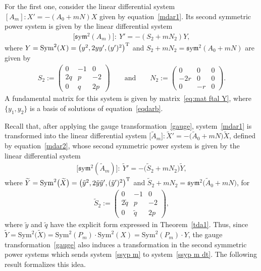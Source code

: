 \documentclass[pdftex]{sigma}%
\numberwithin{equation}{section}
\def\Sym{\mathrm{Sym}}
\def\sym{\mathfrak{s}\mathrm{y}\mathfrak{m}}
\begin{document}
For the first one, consider the linear differential system $[A_m]\colon X'=-(A_0+mN) X$ given by equation~\eqref{mdar1}. Its second symmetric power system is given by the linear differential system
\begin{gather}\label{ssyp m}
\big[\sym^2 (A_m)\big]\colon\ Y'=-(S_2 +m N_2) Y ,
\end{gather}
where $Y=\Sym^2 (X) = \big(y^2 ,2yy', (y')^2\big)^{\rm T}$ and $S_2 +m N_2 = \sym^2 (A_0 +mN)$ are given by
\begin{gather*}
S_2:=\begin{pmatrix} 0&-1&0\\2q &p &-2\\0&q&2p\end{pmatrix} \qquad \text{and} \qquad N_2:=\begin{pmatrix}0&0&0\\ -2r& 0& 0\\0&- r&0\end{pmatrix}\!.
\end{gather*}
A fundamental matrix for this system is given by matrix~\eqref{eq:mat ftal Y}, where $\{ y_1, y_2 \}$ is a basis of solutions of equation~\eqref{eqdarb}.

Recall that, after applying the gauge transformation~\eqref{gauge}, system~\eqref{mdar1} is transformed into the linear differential system $\big[\widetilde{A}_m\big]\colon \widetilde{X}'=-\big(\widetilde A_0+mN\big) \widetilde{X}$, defined by equation~\eqref{mdar2}, whose second symmetric power system is given by the linear differential system
\begin{gather}\label{ssyp m dt}
\big[\sym^2 (\widetilde{A}_m)\big]\colon\ \widetilde{Y}'=-\big(\widetilde{S}_2+ m N_2\big) \widetilde{Y} ,
\end{gather}
where $\widetilde{Y}= \Sym^2 \big(\widetilde{X}\big) = \big(\tilde{y}^2 ,2\tilde{y} \tilde{y}', (\tilde{y}')^2\big)^{\rm T}$ and
$\widetilde{S}_2+ m N_2 = \sym^2 \big(\widetilde{A}_0 +mN\big)$, for
\begin{gather*}
\widetilde{S}_2:=\begin{pmatrix} 0&-1&0 \\ 2\tilde{q} &p &-2 \\ 0& \tilde{q} &2p\end{pmatrix}\!,
\end{gather*}
where $\tilde{y}$ and $\tilde{q}$ have the explicit form expressed in Theorem~\ref{tda1}. Thus, since $\widetilde{Y}= \Sym^2 \big(\widetilde{X}\big) = \Sym^2 (P_m) \cdot \Sym^2 (X) = \Sym^2 (P_m) \cdot Y $, the gauge transformation~\eqref{gauge} also induces a transformation in the second symmetric power systems which sends system~\eqref{ssyp m} to system~\eqref{ssyp m dt}.
The following result formalizes this idea.
\end{document}
